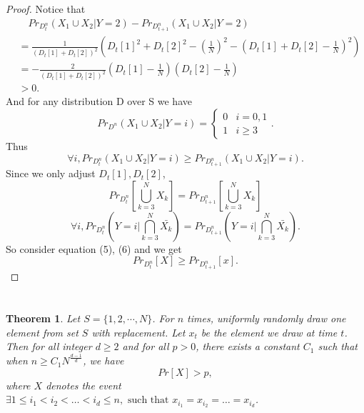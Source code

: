 \documentclass{article}
\newtheorem{theorem}{Theorem}
\begin{document}
\begin{spacing}{1.1}
\begin{proof}
        Notice that
        \begin{equation}
            \begin{aligned}
                &\quad Pr_{D_t^n}(X_1\cup X_2 | Y = 2) - Pr_{D_{t+1}^n}(X_1\cup X_2 | Y = 2)\\
                &= \frac{1}{(D_t[1] + D_t[2])^2}(D_t[1]^2 + D_t[2]^2 - (\frac{1}{N})^2 - (D_t[1] + D_t[2] - \frac{1}{N})^2)\\
                &= -\frac{2}{(D_t[1] + D_t[2])^2}(D_t[1] - \frac{1}{N})(D_t[2] - \frac{1}{N})\\
                &> 0.
            \end{aligned}
        \end{equation}
        And for any distribution D over S we have
        \begin{equation}
            Pr_{D^n}(X_1\cup X_2 | Y = i) =
            \begin{cases}
                0 & i = 0, 1\\
                1 & i \geq 3
            \end{cases}.
        \end{equation}
        Thus
        $$\forall i, Pr_{D_t^n}(X_1\cup X_2 | Y = i) \geq Pr_{D_{t+1}^n}(X_1\cup X_2 | Y = i).$$
        Since we only adjust $D_t[1], D_t[2]$,
        $$Pr_{D_t^n}[\bigcup_{k = 3}^N X_k] = Pr_{D_{t+1}^n}[\bigcup_{k = 3}^N X_k]$$
        $$\forall i, Pr_{D_t^n}(Y = i | \bigcap_{k = 3}^N \bar{X_k}) = Pr_{D_{t+1}^n}(Y = i | \bigcap_{k = 3}^N \bar{X_k}).$$
        So consider equation (5), (6) and we get
        $$Pr_{D_t^n}[X] \geq Pr_{D_{t+1}^n}[x].$$
    \end{proof}

    \section{}

    \subsection{}

    \begin{theorem}

    Let $S = \{1, 2, \cdots, N\}$. For $n$ times, uniformly randomly draw one element from set $S$ with replacement. Let $x_t$ be the element we draw at time $t$. Then for all integer $d\geq 2$ and for all $p > 0$, there exists a constant $C_1$ such that when $n \geq C_1 {N}^{\frac{d-1}{d}}$, we have
    $$Pr[X] > p,$$
    where $X$ denotes the event $\exists 1\leq i_1< i_2<\dots<i_d \leq n, \text{ such that } x_{i_1} = x_{i_2}=\dots=x_{i_d}$.


\end{theorem}
\end{spacing}
\end{document}
